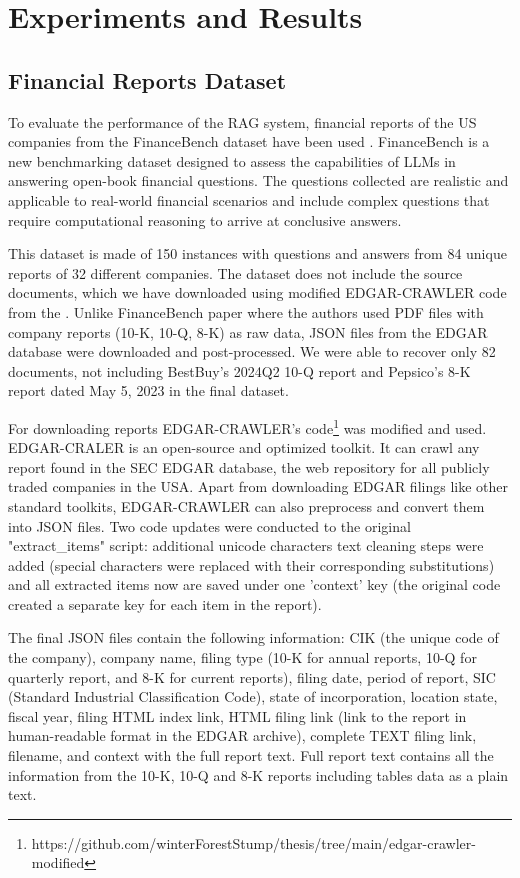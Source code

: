 \section{Experiments and Results}

\subsection{Financial Reports Dataset}
To evaluate the performance of the RAG system, financial reports of the US companies from the FinanceBench dataset have been used \cite{Islam.20Nov2023}. FinanceBench is a new benchmarking dataset designed to assess the capabilities of LLMs in answering open-book financial questions. The questions collected are realistic and applicable to real-world financial scenarios and include complex questions that require computational reasoning to arrive at conclusive answers.

This dataset is made of 150 instances with questions and answers from 84 unique reports of 32 different companies. The dataset does not include the source documents, which we have downloaded using modified EDGAR-CRAWLER code from the \cite{Loukas.2021}. Unlike FinanceBench paper where the authors used PDF files with company reports (10-K, 10-Q, 8-K) as raw data, JSON files from the EDGAR database were downloaded and post-processed. We were able to recover only 82 documents, not including BestBuy's 2024Q2 10-Q report and Pepsico's 8-K report dated May 5, 2023 in the final dataset. 

For downloading reports EDGAR-CRAWLER's code\footnote{https://github.com/winterForestStump/thesis/tree/main/edgar-crawler-modified} was modified and used. EDGAR-CRALER is an open-source and optimized toolkit. It can crawl any report found in the SEC EDGAR database, the web repository for all publicly traded companies in the USA. Apart from downloading EDGAR filings like other standard toolkits, EDGAR-CRAWLER can also preprocess and convert them into JSON files. Two code updates were conducted to the original "extract\_items" script: additional unicode characters text cleaning steps were added (special characters were replaced with their corresponding substitutions)  and all extracted items now are saved under one 'context' key (the original code created a separate key for each item in the report).

The final JSON files contain the following information: CIK (the unique code of the company), company name, filing type (10-K for annual reports, 10-Q for quarterly report, and 8-K for current reports), filing date, period of report, SIC (Standard Industrial Classification Code), state of incorporation, location state, fiscal year, filing HTML index link, HTML filing link (link to the report in human-readable format in the EDGAR archive), complete TEXT filing link, filename, and context with the full report text. Full report text contains all the information from the 10-K, 10-Q and 8-K reports including tables data as a plain text.


